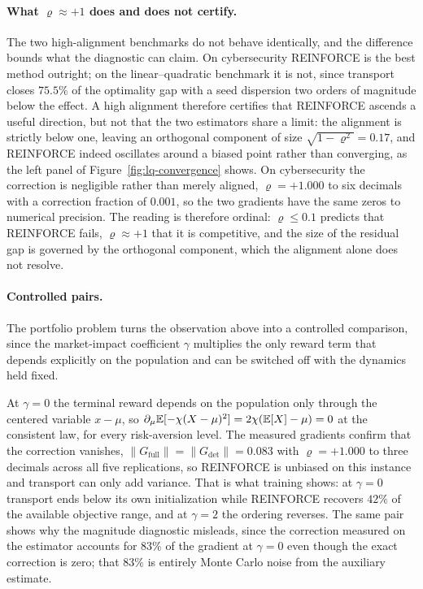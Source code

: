 \paragraph{What $\varrho\approx+1$ does and does not certify.}
The two high-alignment benchmarks do not behave identically, and the difference bounds what the diagnostic can claim. On cybersecurity REINFORCE is the best method outright; on the linear--quadratic benchmark it is not, since transport closes $75.5\%$ of the optimality gap with a seed dispersion two orders of magnitude below the effect. A high alignment therefore certifies that REINFORCE ascends a useful direction, but not that the two estimators share a limit: the alignment is strictly below one, leaving an orthogonal component of size $\sqrt{1-\varrho^2}=0.17$, and REINFORCE indeed oscillates around a biased point rather than converging, as the left panel of Figure~\ref{fig:lq-convergence} shows. On cybersecurity the correction is negligible rather than merely aligned, $\varrho=+1.000$ to six decimals with a correction fraction of $0.001$, so the two gradients have the same zeros to numerical precision. The reading is therefore ordinal: $\varrho\leq0.1$ predicts that REINFORCE fails, $\varrho\approx+1$ that it is competitive, and the size of the residual gap is governed by the orthogonal component, which the alignment alone does not resolve.

\paragraph{Controlled pairs.}
The portfolio problem turns the observation above into a controlled comparison, since the market-impact coefficient $\gamma$ multiplies the only reward term that depends explicitly on the population and can be switched off with the dynamics held fixed.

At $\gamma=0$ the terminal reward depends on the population only through the centered variable $x-\mu$, so $\partial_\mu\mathbb{E}[-\chi(X-\mu)^2]=2\chi(\mathbb{E}[X]-\mu)=0$ at the consistent law, for every risk-aversion level. The measured gradients confirm that the correction vanishes, $\|G_{\mathrm{full}}\|=\|G_{\mathrm{det}}\|=0.083$ with $\varrho=+1.000$ to three decimals across all five replications, so REINFORCE is unbiased on this instance and transport can only add variance. That is what training shows: at $\gamma=0$ transport ends below its own initialization while REINFORCE recovers $42\%$ of the available objective range, and at $\gamma=2$ the ordering reverses. The same pair shows why the magnitude diagnostic misleads, since the correction measured on the estimator accounts for $83\%$ of the gradient at $\gamma=0$ even though the exact correction is zero; that $83\%$ is entirely Monte Carlo noise from the auxiliary estimate.

